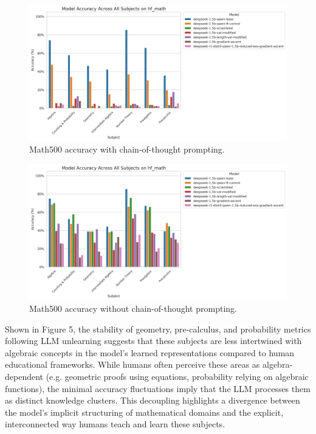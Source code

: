 \documentclass[10pt]{article}
\begin{document}
\begin{figure}[h]
    \centering
    \includegraphics[width=0.9\linewidth]{main_prompt_hf_math_accuracy_all_subjects_combined_20250505_042444.png}
    \caption{Math500 accuracy with chain-of-thought prompting.}
    \label{fig:math500_cot}
\end{figure}
\begin{figure}[h]
    \centering
    \includegraphics[width=0.9\linewidth]{new_prompt_hf_math_accuracy_all_subjects_combined_20250505_210815.png}
    \caption{Math500 accuracy without chain-of-thought prompting.}
    \label{fig:math500_no_cot}
\end{figure}
Shown in Figure 5, the stability of geometry, pre-calculus, and probability metrics following LLM unlearning suggests that these subjects are less intertwined with algebraic concepts in the model’s learned representations compared to human educational frameworks. While humans often perceive these areas as algebra-dependent (e.g. geometric proofs using equations, probability relying on algebraic functions), the minimal accuracy fluctuations imply that the LLM processes them as distinct knowledge clusters. This decoupling highlights a divergence between the model’s implicit structuring of mathematical domains and the explicit, interconnected way humans teach and learn these subjects.
\end{document}
